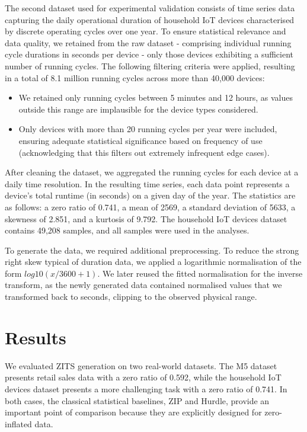 \documentclass[make,article,submit,moreauthors]{Definitions/mdpi}
\begin{document}
The second dataset used for experimental validation consists of time series data capturing the daily operational duration of household IoT devices characterised by discrete operating cycles over one year. To ensure statistical relevance and data quality, we retained from the raw dataset - comprising individual running cycle durations in seconds per device - only those devices exhibiting a sufficient number of running cycles. The following filtering criteria were applied, resulting in a total of 8.1 million running cycles across more than 40,000 devices:
\begin{itemize}
    \item We retained only running cycles between 5 minutes and 12 hours, as values outside this range are implausible for the device types considered.
    \item Only devices with more than 20 running cycles per year were included, ensuring adequate statistical significance based on frequency of use (acknowledging that this filters out extremely infrequent edge cases).
\end{itemize}
After cleaning the dataset, we aggregated the running cycles for each device at a daily time resolution. In the resulting time series, each data point represents a device's total runtime (in seconds) on a given day of the year. The statistics are as follows: a zero ratio of 0.741, a mean of 2569, a standard deviation of 5633, a skewness of 2.851, and a kurtosis of 9.792. The household IoT devices dataset contains 49,208 samples, and all samples were used in the analyses.

To generate the data, we required additional preprocessing. To reduce the strong right skew typical of duration data, we applied a logarithmic normalisation of the form $log10(x/3600+1)$. We later reused the fitted normalisation for the inverse transform, as the newly generated data contained normalised values that we transformed back to seconds, clipping to the observed physical range.


\section{Results}
We evaluated ZITS generation on two real-world datasets. The M5 dataset \cite{ref38} presents retail sales data with a zero ratio of 0.592, while the household IoT devices dataset presents a more challenging task with a zero ratio of 0.741. In both cases, the classical statistical baselines, ZIP and Hurdle, provide an important point of comparison because they are explicitly designed for zero-inflated data.
\end{document}
